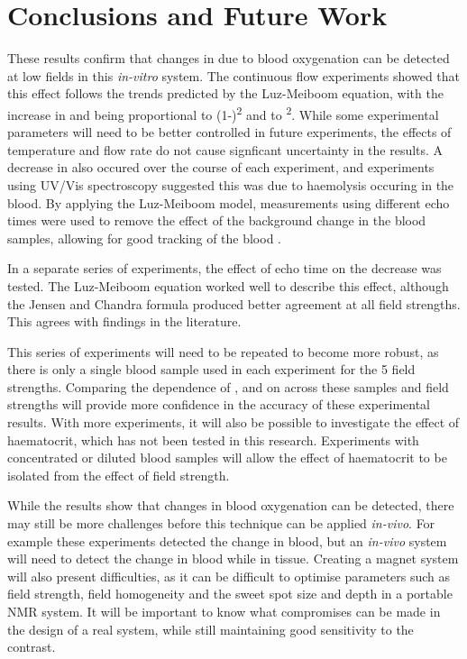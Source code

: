 \chapter{Conclusions and Future Work}\label{ch:conc}

These results confirm that changes in \Ttwo due to blood oxygenation can be detected at low fields in this \textit{in-vitro} system.
The continuous flow experiments showed that this \Ttwo effect follows the trends predicted by the Luz-Meiboom equation, with the increase in \Rtwo and \Kzero being proportional to (1-\SOtwo)\textsuperscript{2} and to \Bzero\textsuperscript{2}.
While some experimental parameters will need to be better controlled in future experiments, the effects of temperature and flow rate do not cause signficant uncertainty in the results.
A decrease in \Ttwo also occured over the course of each experiment, and experiments using UV/Vis spectroscopy suggested this was due to haemolysis occuring in the blood.
By applying the Luz-Meiboom model, measurements using different echo times were used to remove the effect of the background \Ttwo change in the blood samples, allowing for good tracking of the blood \SOtwo.

In a separate series of experiments, the effect of echo time on the \Ttwo decrease was tested.
The Luz-Meiboom equation worked well to describe this effect, although the Jensen and Chandra formula produced better agreement at all field strengths.
This agrees with findings in the literature.

This series of experiments will need to be repeated to become more robust, as there is only a single blood sample used in each experiment for the 5 field strengths.
Comparing the dependence of \Ttwo, \Rtwo and \Kzero on \SOtwo across these samples and field strengths will provide more confidence in the accuracy of these experimental results.
With more experiments, it will also be possible to investigate the effect of haematocrit, which has not been tested in this research.
Experiments with concentrated or diluted blood samples will allow the effect of haematocrit to be isolated from the effect of field strength.

While the results show that changes in blood oxygenation can be detected, there may still be more challenges before this technique can be applied \textit{in-vivo}.
For example these experiments detected the \Ttwo change in blood, but an \textit{in-vivo} system will need to detect the \Ttwo change in blood while in tissue.
Creating a magnet system will also present difficulties, as it can be difficult to optimise parameters such as field strength, field homogeneity and the sweet spot size and depth in a portable NMR system.
It will be important to know what compromises can be made in the design of a real system, while still maintaining good sensitivity to the \Ttwo contrast.

